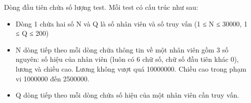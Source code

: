 Dòng đầu tiên chứa số lượng test. Mỗi test có cấu trúc như sau:  
\begin{itemize}
	\item     Dòng 1 chứa hai số N và Q là số nhân viên và số truy vấn (1 ≤ N ≤ 30000, 1 ≤ Q ≤ 200)   
	\item     N dòng tiếp theo mỗi dòng chứa thông tin về một nhân viên gồm 3 số nguyên: số hiệu của nhân viên (luôn có 6 chữ số, chữ số đầu tiên khác 0), lương và chiều cao. Lương không vượt quá 10000000. Chiều cao trong phạm vi 1000000 đến 2500000.   
	\item     Q dòng tiếp theo mỗi dòng chứa số hiệu của một nhân viên cần truy vấn.   
\end{itemize}

\